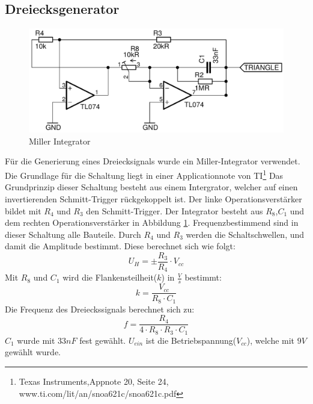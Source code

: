 \subsection{Dreiecksgenerator}
\begin{figure}[H]
\centering
 \includegraphics[scale=0.55]{gfx/triangle_generator.pdf}
 \caption{Miller Integrator}
	\label{triangle} 
\end{figure}
Für die Generierung eines Dreiecksignals wurde ein Miller-Integrator verwendet.
Die Grundlage für die Schaltung liegt in einer Applicationnote von TI\footnote{ Texas Instruments,Appnote 20, Seite 24, www.ti.com/lit/an/snoa621c/snoa621c.pdf}
Das Grundprinzip dieser Schaltung besteht aus einem Intergrator, welcher auf einen invertierenden Schmitt-Trigger rückgekoppelt ist.
Der linke Operationsverstärker bildet mit $R_4$ und $R_3$ den Schmitt-Trigger. Der Integrator besteht aus $R_8$,$C_1$ und dem rechten Operationsverstärker in Abbildung \ref{triangle}.
Frequenzbestimmend sind in dieser Schaltung alle Bauteile. Durch $R_4$ und $R_3$ werden die Schaltschwellen, und damit die Amplitude bestimmt. Diese berechnet sich wie folgt: 
\begin{equation}
U_H = \pm\frac{R_3}{R_4}\cdot V_{cc}
\end{equation}
Mit $R_8$ und $C_1$ wird die Flankensteilheit($k$) in $\frac{V}{s}$ bestimmt:
\begin{equation}
k=\frac{V_{cc}}{R_8 \cdot C_1}
\end{equation}
Die Frequenz des Dreieckssignals berechnet sich zu:
\begin{equation}
f = \frac{R_4}{4 \cdot R_8 \cdot R_3 \cdot C_1}
\end{equation}
$C_1$ wurde mit $33nF$ fest gewählt. $U_{ein}$ ist die Betriebspannung($V_{cc}$), welche mit $9V$ gewählt wurde.